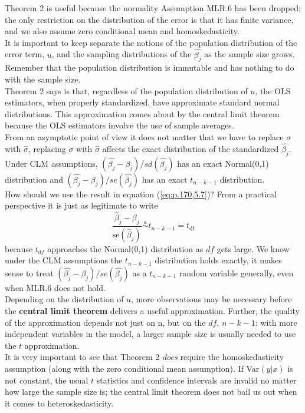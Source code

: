 \documentclass[a4paper, 10pt]{article}
\theoremstyle{definition}	%
\begin{document}
Theorem 2 is useful because the normality Assumption MLR.6 has been dropped; the only
restriction on the distribution of the error is that it has finite variance, and we also assume zero conditional mean and homoskedasticity.\\
It is important to keep separate the notions of the population distribution of the error term, $u$, and the sampling distributions of the $\hat{\beta_j}$ as the sample size grows. Remember that the population distribution is immutable and has nothing to do with the sample size.\\
Theorem 2 says is that, regardless of the population distribution of $u$, the OLS estimators, when properly standardized, have approximate standard normal distributions. This approximation comes about by the central limit theorem because the OLS estimators involve the use of sample averages.\\
From an asymptotic point of view it does not matter that we have to replace $\sigma$ with $\hat{\sigma}$, replacing $\sigma$ with $\hat{\sigma}$ affects the exact distribution of the standardized $\hat{\beta_j}$. Under CLM assumptions, $(\hat{\beta_j} - \beta_j)/sd(\hat{\beta_j})$ has an exact Normal(0,1) distribution and   $(\hat{\beta_j} - \beta_j)/se(\hat{\beta_j})$ has an exact $t_{n-k-1}$ distribution.\\
How should we use the result in equation (\ref{eq:p.170,5.7})? From a practical perspective it is just as legitimate to write 
\begin{equation}
    \frac{\hat{\beta}_j - \beta_j}{\text{se}(\hat{\beta}_j)} \overset{a}{\sim} t_{n-k-1} = t_{\text{df}} \label{eq:p.171,5.8}
\end{equation}
because $t_{df}$ approaches the Normal(0,1) distribution as $df$ gets large. We know under the CLM assumptions the $t_{n-k-1}$ distribution holds exactly, it makes sense to treat
$(\hat{\beta_j} - \beta_j)/se(\hat{\beta_j})$ as a $t_{n-k-1}$ random variable generally, 
even when MLR.6 does not hold.\\
Depending on the distribution of $u$, more observations may be necessary before the \textbf{central limit theorem} delivers a useful approximation. Further, the quality of the approximation depends not just on n, but on the $df$, $n-k-1$: with more independent variables in the model, a larger sample size is usually needed to use the $t$ approximation.\\
It is very important to see that Theorem 2 \textit{does} require the homoskedasticity assumption (along with the zero conditional mean assumption). If Var$(y|x)$ is not constant, the usual $t$ statistics and confidence intervals are invalid no matter how large the sample size is; the central limit theorem does not bail us out when it comes to heteroskedasticity.\\
\end{document}

